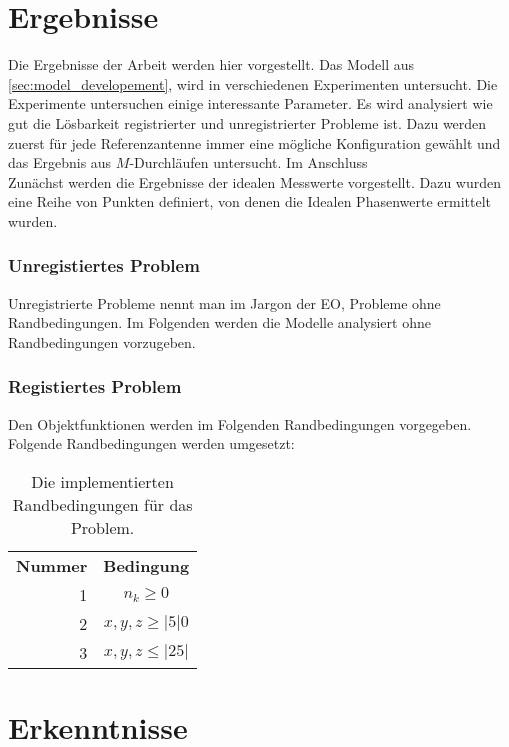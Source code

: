 \section{Ergebnisse}
%
Die Ergebnisse der Arbeit werden hier vorgestellt. Das Modell aus \ref{sec:model_developement}, wird in verschiedenen Experimenten untersucht. Die Experimente untersuchen einige interessante Parameter. Es wird analysiert wie gut die Lösbarkeit registrierter und unregistrierter Probleme ist. Dazu werden zuerst für jede Referenzantenne immer eine mögliche Konfiguration gewählt und das Ergebnis aus $M$-Durchläufen untersucht. Im Anschluss 
\\
Zunächst werden die Ergebnisse der idealen Messwerte vorgestellt. Dazu wurden eine Reihe von Punkten definiert, von denen die Idealen Phasenwerte ermittelt wurden.
%
\subsubsection{Unregistiertes Problem}
%
Unregistrierte Probleme nennt man im Jargon der EO, Probleme ohne Randbedingungen. Im Folgenden werden die Modelle analysiert ohne Randbedingungen vorzugeben. 
%
\subsubsection{Registiertes Problem}
%
Den Objektfunktionen werden im Folgenden Randbedingungen vorgegeben. Folgende Randbedingungen werden umgesetzt:
%
\begin{table} [ht!]
	\begin{center}
		\begin{tabular}{rc}
			\textbf{Nummer} & \textbf{Bedingung} \\
			1 & $n_k\ge0$ \\
			2 & $x,y,z \ge |5|0$\\
			3 & $x,y,z \le |25|$\\
%			
		\end{tabular}
	\end{center}
	\caption[Randbedingungen für Optimierung]{Die implementierten Randbedingungen für das Problem.}
	\label{tab:registrations}
\end{table}
%
\section{Erkenntnisse}
%
\lipsum[1-10]